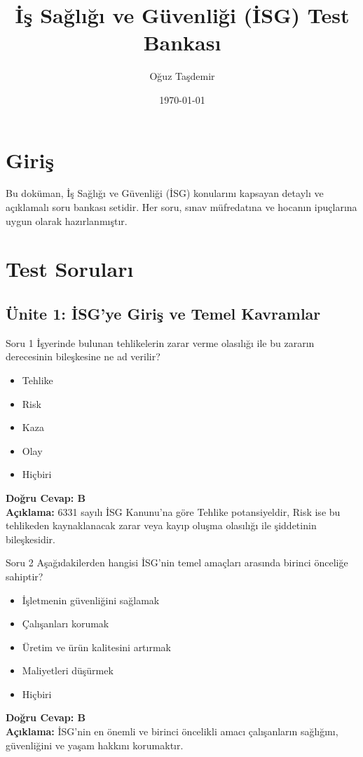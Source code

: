 \documentclass[12pt,a4paper]{article}
\title{\textbf{İş Sağlığı ve Güvenliği (İSG) Test Bankası}}
\author{Oğuz Taşdemir}
\date{\today}
\begin{document}
\maketitle
\newpage

\tableofcontents
\newpage

\section{Giriş}
Bu doküman, İş Sağlığı ve Güvenliği (İSG) konularını kapsayan detaylı ve açıklamalı soru bankası setidir. Her soru, sınav müfredatına ve hocanın ipuçlarına uygun olarak hazırlanmıştır.

\newpage
\section{Test Soruları}

\subsection{Ünite 1: İSG'ye Giriş ve Temel Kavramlar}
\begin{testcard}{Soru 1}
    İşyerinde bulunan tehlikelerin zarar verme olasılığı ile bu zararın derecesinin bileşkesine ne ad verilir?
    \begin{itemize}
        \item[A)] Tehlike
        \item[B)] Risk
        \item[C)] Kaza
        \item[D)] Olay
        \item[E)] Hiçbiri
    \end{itemize}
    \tcblower
    \textbf{Doğru Cevap: B} \\
    \textbf{Açıklama:} 6331 sayılı İSG Kanunu'na göre Tehlike potansiyeldir, Risk ise bu tehlikeden kaynaklanacak zarar veya kayıp oluşma olasılığı ile şiddetinin bileşkesidir.
\end{testcard}

\begin{testcard}{Soru 2}
    Aşağıdakilerden hangisi İSG'nin temel amaçları arasında birinci önceliğe sahiptir?
    \begin{itemize}
        \item[A)] İşletmenin güvenliğini sağlamak
        \item[B)] Çalışanları korumak
        \item[C)] Üretim ve ürün kalitesini artırmak
        \item[D)] Maliyetleri düşürmek
        \item[E)] Hiçbiri
    \end{itemize}
    \tcblower
    \textbf{Doğru Cevap: B} \\
    \textbf{Açıklama:} İSG'nin en önemli ve birinci öncelikli amacı çalışanların sağlığını, güvenliğini ve yaşam hakkını korumaktır.
\end{testcard}
\end{document}
